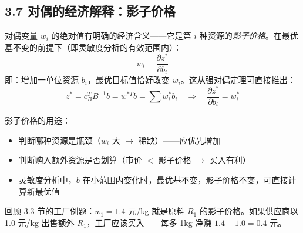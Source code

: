 \subsection{3.7 对偶的经济解释：影子价格}

对偶变量 $w_i$ 的绝对值有明确的经济含义——它是第 $i$ 种资源的\emph{影子价格}。在最优基不变的前提下（即灵敏度分析的有效范围内）：
\[
w_i = \frac{\partial z^*}{\partial b_i}
\]
即：增加一单位资源 $b_i$，最优目标值恰好改变 $w_i$。这从强对偶定理可直接推出：
\[
z^* = c_B^T B^{-1} b = w^{*T} b = \sum w_i^* b_i \quad\Rightarrow\quad \frac{\partial z^*}{\partial b_i} = w_i^*
\]

影子价格的用途：
\begin{itemize}
  \item 判断哪种资源是瓶颈（$w_i$ 大 $\to$ 稀缺）——应优先增加
  \item 判断购入额外资源是否划算（市价 $<$ 影子价格 $\to$ 买入有利）
  \item 灵敏度分析中，$b$ 在小范围内变化时，最优基不变，影子价格不变，可直接计算新最优值
\end{itemize}

回顾 3.3 节的工厂例题：$w_1=1.4$ 元/kg 就是原料 $R_1$ 的影子价格。如果供应商以 1.0 元/kg 出售额外 $R_1$，工厂应该买入——每多 1kg 净赚 $1.4-1.0=0.4$ 元。

